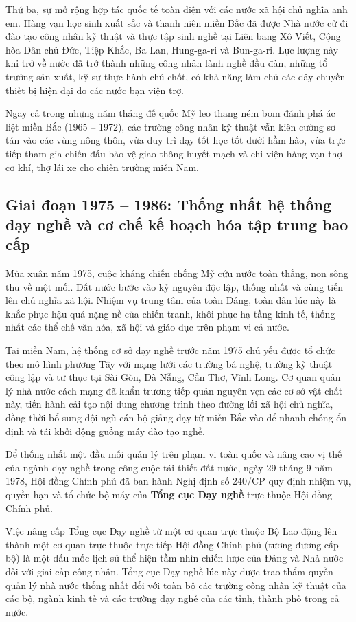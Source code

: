Thứ ba, sự mở rộng hợp tác quốc tế toàn diện với các nước xã hội chủ nghĩa anh em. Hàng vạn học sinh xuất sắc và thanh niên miền Bắc đã được Nhà nước cử đi đào tạo công nhân kỹ thuật và thực tập sinh nghề tại Liên bang Xô Viết, Cộng hòa Dân chủ Đức, Tiệp Khắc, Ba Lan, Hung-ga-ri và Bun-ga-ri. Lực lượng này khi trở về nước đã trở thành những công nhân lành nghề đầu đàn, những tổ trưởng sản xuất, kỹ sư thực hành chủ chốt, có khả năng làm chủ các dây chuyền thiết bị hiện đại do các nước bạn viện trợ. 

Ngay cả trong những năm tháng đế quốc Mỹ leo thang ném bom đánh phá ác liệt miền Bắc (1965 -- 1972), các trường công nhân kỹ thuật vẫn kiên cường sơ tán vào các vùng nông thôn, vừa duy trì dạy tốt học tốt dưới hầm hào, vừa trực tiếp tham gia chiến đấu bảo vệ giao thông huyết mạch và chi viện hàng vạn thợ cơ khí, thợ lái xe cho chiến trường miền Nam.

\subsection{Giai đoạn 1975 -- 1986: Thống nhất hệ thống dạy nghề và cơ chế kế hoạch hóa tập trung bao cấp}

Mùa xuân năm 1975, cuộc kháng chiến chống Mỹ cứu nước toàn thắng, non sông thu về một mối. Đất nước bước vào kỷ nguyên độc lập, thống nhất và cùng tiến lên chủ nghĩa xã hội. Nhiệm vụ trung tâm của toàn Đảng, toàn dân lúc này là khắc phục hậu quả nặng nề của chiến tranh, khôi phục hạ tầng kinh tế, thống nhất các thể chế văn hóa, xã hội và giáo dục trên phạm vi cả nước.

Tại miền Nam, hệ thống cơ sở dạy nghề trước năm 1975 chủ yếu được tổ chức theo mô hình phương Tây với mạng lưới các trường bá nghệ, trường kỹ thuật công lập và tư thục tại Sài Gòn, Đà Nẵng, Cần Thơ, Vĩnh Long. Cơ quan quản lý nhà nước cách mạng đã khẩn trương tiếp quản nguyên vẹn các cơ sở vật chất này, tiến hành cải tạo nội dung chương trình theo đường lối xã hội chủ nghĩa, đồng thời bổ sung đội ngũ cán bộ giảng dạy từ miền Bắc vào để nhanh chóng ổn định và tái khởi động guồng máy đào tạo nghề.

Để thống nhất một đầu mối quản lý trên phạm vi toàn quốc và nâng cao vị thế của ngành dạy nghề trong công cuộc tái thiết đất nước, ngày 29 tháng 9 năm 1978, Hội đồng Chính phủ đã ban hành Nghị định số 240/CP quy định nhiệm vụ, quyền hạn và tổ chức bộ máy của \textbf{Tổng cục Dạy nghề} trực thuộc Hội đồng Chính phủ. 

Việc nâng cấp Tổng cục Dạy nghề từ một cơ quan trực thuộc Bộ Lao động lên thành một cơ quan trực thuộc trực tiếp Hội đồng Chính phủ (tương đương cấp bộ) là một dấu mốc lịch sử thể hiện tầm nhìn chiến lược của Đảng và Nhà nước đối với giai cấp công nhân. Tổng cục Dạy nghề lúc này được trao thẩm quyền quản lý nhà nước thống nhất đối với toàn bộ các trường công nhân kỹ thuật của các bộ, ngành kinh tế và các trường dạy nghề của các tỉnh, thành phố trong cả nước.

